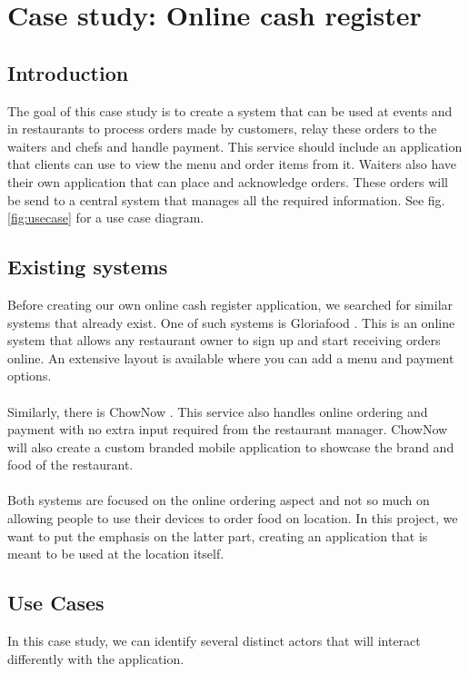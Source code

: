 \documentclass[12pt]{article}
\begin{document}
\section{Case study: Online cash register}\label{sec:casestudy}
\begin{multicols}{2}

\subsection{Introduction}
The goal of this case study is to create a system that can be used at events and in restaurants to process orders made by customers, relay these orders to the waiters and chefs and handle payment. This service should include an application that clients can use to view the menu and order items from it. Waiters also have their own application that can place and acknowledge orders. These orders will be send to a central system that manages all the required information. See fig. \ref{fig:usecase} for a use case diagram.
\subsection{Existing systems}
Before creating our own online cash register application, we searched for similar systems that already exist. One of such systems is Gloriafood \cite{Gloriafood:online}. This is an online system that allows any restaurant owner to sign up and start receiving orders online. An extensive layout is available where you can add a menu and payment options.
\\\\
Similarly, there is ChowNow \cite{Chownow:online}. This service also handles online ordering and payment with no extra input required from the restaurant manager. ChowNow will also create a custom branded mobile application to showcase the brand and food of the restaurant.
\\\\
Both systems are focused on the online ordering aspect and not so much on allowing people to use their devices to order food on location. In this project, we want to put the emphasis on the latter part, creating an application that is meant to be used at the location itself.
\subsection{Use Cases}
In this case study, we can identify several distinct actors that will interact differently with the application.

\end{multicols}
\end{document}
